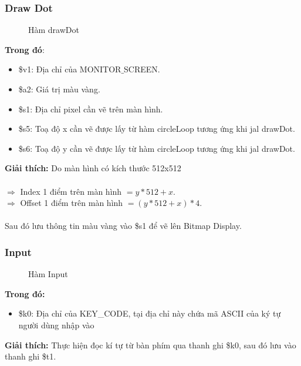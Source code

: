 \documentclass[a4paper,12pt]{article}
\begin{document}
    \subsubsection{Draw Dot}
    \FloatBarrier
    \begin{figure}[ht!]
    	\centerline{}
    	\caption{Hàm drawDot}
    	\label{fig:bai7}
    \end{figure}
    \noindent
    \textbf{Trong đó}:
    \begin{itemize}
        \item \$v1: Địa chỉ của MONITOR$\_$SCREEN.
        \item \$a2: Giá trị màu vàng.
        \item \$s1: Địa chỉ pixel cần vẽ trên màn hình.
        \item \$s5: Toạ độ x cần vẽ được lấy từ hàm circleLoop tương ứng khi jal drawDot.
        \item \$s6: Toạ độ y cần vẽ được lấy từ hàm circleLoop tương ứng khi jal drawDot.
    \end{itemize}
    \textbf{Giải thích:} Do màn hình có kích thước 512x512 \\ \\
    $\Rightarrow$ Index 1 điểm trên màn hình $= y*512 + x$. \\
    $\Rightarrow$ Offset 1 điểm trên màn hình $= (y*512 + x) * 4$. \\ \\
    Sau đó lưu thông tin màu vàng vào \$s1 để vẽ lên Bitmap Display.
    \clearpage
    \subsubsection{Input}
    \FloatBarrier
    \begin{figure}[ht!]
    	\centerline{}
    	\caption{Hàm Input}
    	\label{fig:bai6}
    \end{figure}
    \noindent
    \textbf{Trong đó:}
    \begin{itemize}
        \item \$k0: Địa chỉ của KEY\_CODE, tại địa chỉ này chứa mã ASCII của ký tự người dùng nhập vào
    \end{itemize}
    \textbf{Giải thích:} Thực hiện đọc kí tự từ bàn phím qua thanh ghi \$k0, sau đó lưu vào thanh ghi \$t1.
\end{document}
